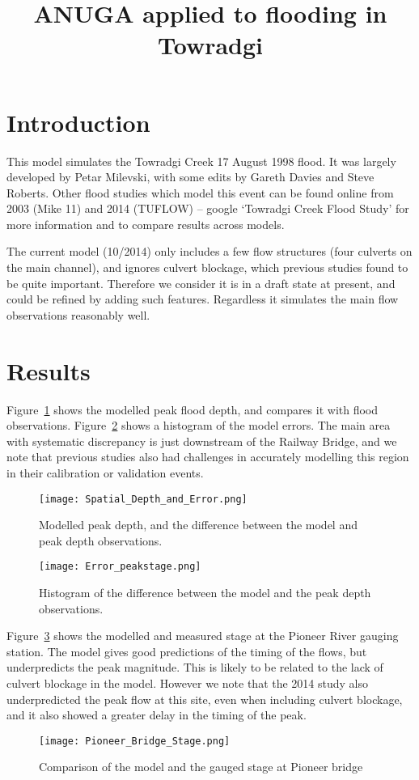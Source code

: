 \documentclass{article}
\begin{document}
\title{ANUGA applied to flooding in Towradgi}

\maketitle

\section{Introduction}
This model simulates the Towradgi Creek 17 August 1998 flood. It was largely
developed by Petar Milevski, with some edits by Gareth Davies and Steve
Roberts. Other flood studies which model this event can be found online from
2003 (Mike 11) and 2014 (TUFLOW) -- google `Towradgi Creek Flood Study' for
more information and to compare results across models. 

The current model (10/2014) only includes a few flow structures (four culverts
on the main channel), and ignores culvert blockage, which previous studies
found to be quite important. Therefore we consider it is in a draft state at
present, and could be refined by adding such features. Regardless it simulates
the main flow observations reasonably well.

\section{Results}

Figure~\ref{fig:spatial} shows the modelled peak flood depth, and compares it with flood
observations. Figure~\ref{fig:hist} shows a histogram of the model errors. The main area
with systematic discrepancy is just downstream of the Railway Bridge, and we
note that previous studies also had challenges in accurately modelling this
region in their calibration or validation events. 

\begin{figure}
\center
\texttt{[image: Spatial\_Depth\_and\_Error.png]}
\caption{Modelled peak depth, and the difference between the model and peak depth observations.}
\label{fig:spatial}
\end{figure}

\begin{figure}
\center
\texttt{[image: Error\_peakstage.png]}
\caption{Histogram of the difference between the model and the peak depth observations.}
\label{fig:hist}
\end{figure}

Figure~\ref{fig:pioneer} shows the modelled and measured stage at the Pioneer
River gauging station. The model gives good predictions of the timing of the
flows, but underpredicts the peak magnitude. This is likely to be related to
the lack of culvert blockage in the model. However we note that the 2014 study
also underpredicted the peak flow at this site, even when including culvert
blockage, and it also showed a greater delay in the timing of the peak. 

\begin{figure}
\center
\texttt{[image: Pioneer\_Bridge\_Stage.png]}
\caption{Comparison of the model and the gauged stage at Pioneer bridge}
\label{fig:pioneer}
\end{figure}
\end{document}
